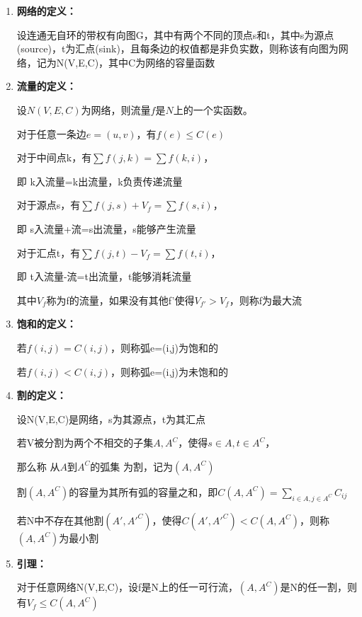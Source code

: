 \documentclass[UTF8]{ctexart}
\begin{document}
\begin{enumerate}
      \item
            \textbf{网络的定义：}

            设连通无自环的带权有向图G，其中有两个不同的顶点s和t，其中s为源点(source)，t为汇点(sink)，且每条边的权值都是非负实数，则称该有向图为网络，记为N(V,E,C)，其中C为网络的容量函数


      \item
            \textbf{流量的定义： }

            设$N(V,E,C)$为网络，则流量$f$是$N$上的一个实函数。

            对于任意一条边$e=(u,v)$，有$f(e)\le C(e)$

            对于中间点k，有$\sum f(j,k)=\sum f(k,i)$，

            即 k入流量=k出流量，k负责传递流量

            对于源点s，有$\sum f(j,s)+V_f=\sum f(s,i)$，

            即 s入流量+流=s出流量，s能够产生流量

            对于汇点t，有$\sum f(j,t)-V_f=\sum f(t,i)$，

            即 t入流量-流=t出流量，t能够消耗流量

            其中$V_f$称为f的流量，如果没有其他f'使得$V_{f'}>V_f$，则称f为最大流

      \item
            \textbf{饱和的定义： }


            若$f(i,j)=C(i,j)$，则称弧e=(i,j)为饱和的

            若$f(i,j)<C(i,j)$，则称弧e=(i,j)为未饱和的

      \item
            \textbf{割的定义： }

            设N(V,E,C)是网络，s为其源点，t为其汇点

            若V被分割为两个不相交的子集$A,A^C$，使得$s\in A,t\in A^C$，

            那么称 从$A$到$A^C$的弧集 为割，记为$(A,A^C)$

            割$(A,A^C)$的容量为其所有弧的容量之和，即$C(A,A^C)=\sum_{i\in A,j\in A^C}C_{ij}$

            若N中不存在其他割$(A',A'^C)$，使得$C(A',A'^C)<C(A,A^C)$，则称$(A,A^C)$为最小割


      \item
            \textbf{引理： }

            对于任意网络N(V,E,C)，设f是N上的任一可行流，$(A,A^C)$是N的任一割，则有$V_f\le C(A,A^C)$


\end{enumerate}
\end{document}
